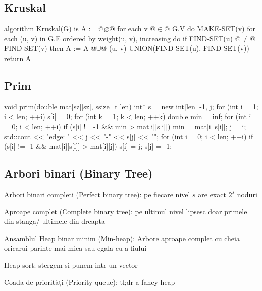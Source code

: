 \documentclass[11pt,a4paper]{report}
\begin{document}
\subsection*{Kruskal}
\begin{py}
algorithm Kruskal(G) is
A := @$\varnothing$@
for each v @$\in$@ G.V do
    MAKE-SET(v)
for each (u, v) in G.E ordered by weight(u, v), increasing do
    if FIND-SET(u) @$\neq$@ FIND-SET(v) then
       A := A @$\cup$@ {(u, v)}
       UNION(FIND-SET(u), FIND-SET(v))
return A
\end{py}
\subsection*{Prim}
\begin{cpp}
void prim(double mat[sz][sz], ssize_t len) {
    int* s = new int[len] {-1}, j;
    for (int i = 1; i < len; ++i) s[i] = 0;
    for (int k = 1; k < len; ++k) {
        double min = inf;
        for (int i = 0; i < len; ++i)
            if (s[i] != -1 && min > mat[i][s[i]]) {
                min = mat[i][s[i]];
                j = i;
            }
        std::cout << "edge: " << j << "-" << s[j] << "\n";
        for (int i = 0; i < len; ++i)
            if (s[i] != -1 && mat[i][s[i]] > mat[i][j])
                s[i] = j;
        s[j] = -1;
    }
}
\end{cpp}
\subsection*{Arbori binari (Binary Tree)}

\begin{description}\setlength{\itemsep}{-2pt}
\item Arbori binari completi (Perfect binary tree): pe fiecare nivel $s$ are exact $2^s$ noduri
\item Aproape complet (Complete binary tree): pe ultimul nivel lipsesc doar primele din stanga/ ultimele din dreapta

\item Ansamblul Heap binar minim (Min-heap): Arbore aproape complet cu cheia oricarui parinte mai mica sau egala cu a fiului
\item Heap sort: stergem si punem intr-un vector

\item Coada de priorități (Priority queue): tl;dr a fancy heap
\end{description}
\end{document}

